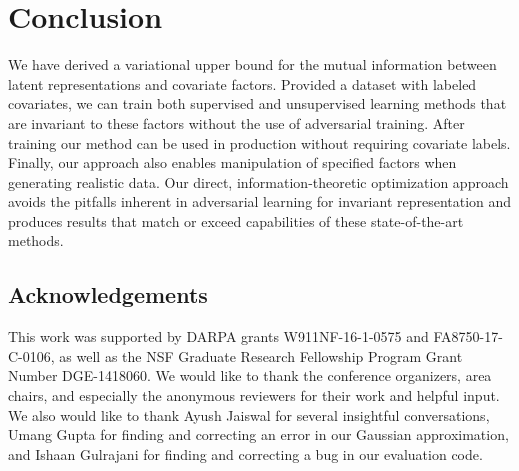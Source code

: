 \section{Conclusion}

We have derived a variational upper bound for the mutual information between latent representations and covariate factors. Provided a dataset with labeled covariates, we can train both supervised and unsupervised learning methods that are invariant to these factors without the use of adversarial training. After training our method can be used in production without requiring covariate labels. Finally, our approach also enables manipulation of specified factors when generating realistic data. Our direct, information-theoretic optimization approach avoids the pitfalls inherent in adversarial learning for invariant representation and produces results that match or exceed capabilities of these state-of-the-art methods.

\subsection*{Acknowledgements}

This work was supported by DARPA grants W911NF-16-1-0575 and FA8750-17-C-0106, as well as the NSF Graduate Research Fellowship Program Grant Number DGE-1418060. We would like to thank the conference organizers, area chairs, and especially the anonymous reviewers for their work and helpful input. We also would like to thank Ayush Jaiswal for several insightful conversations, Umang Gupta for finding and correcting an error in our Gaussian approximation, and Ishaan Gulrajani for finding and correcting a bug in our evaluation code.


